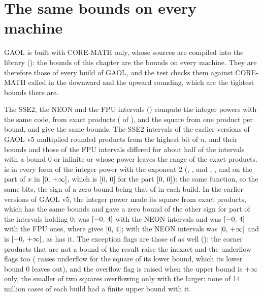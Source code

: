 \section{The same bounds on every machine}\label{sec:accuracy-same-bounds}
%
%

GAOL is built with CORE-MATH only, whose sources are compiled into the
library (): the bounds of this chapter are the
bounds on every machine. They are therefore those of every build of GAOL,
and the test  checks them against CORE-MATH
called in the downward and the upward rounding, which are the tightest
bounds there are.

\medskip
The SSE2, the NEON and the FPU intervals () compute the
integer powers with the same code, from exact products
( of ), and
the square from one product per bound, and give the same bounds. The SSE2
intervals of the earlier versions of GAOL v5 multiplied rounded products from the highest bit of
$n$, and their bounds and those of the FPU intervals differed for about half
of the intervals with a bound $0$ or infinite or whose power leaves the range
of the exact products.\newinvfive{}  is  in every form of
the integer power with the exponent 2 (, ,
 and \code{[2]}, , and
 on the part of $x$ in
$[0,\,+\infty]$, which is $[0,\,0]$ for the part
$[0,\,0]$):\newinvfive{} the same function, so the same bits, the sign
of a zero bound being that of  in each build. In the earlier versions of GAOL v5, the integer power
made its square from exact products, which has the same bounds and gave a
zero bound of the other sign for part of the intervals holding $0$:
 was $[-0,\,4]$ with the NEON intervals and
 was $[-0,\,4]$ with the FPU ones, where
 gives $[0,\,4]$; with the NEON intervals
 was $[0,\,+\infty]$ and is
$[-0,\,+\infty]$, as  has it. The exception flags are those
of  as well (): the corner products
that are not a bound of the result raise the inexact and the underflow
flags too ( raises underflow for the square
of its lower bound, which its lower bound $0$ leaves out), and the
overflow flag is raised when the upper bound is $+\infty$ only, the
smaller of two squares overflowing only with the larger: none of 14
million cases of each build had a finite upper bound with it.

